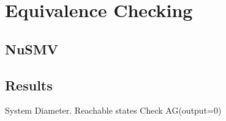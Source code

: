 \documentclass[11pt]{article}
\begin{document}
	

%

\section{Equivalence Checking} 
\subsection{NuSMV}
\subsection{Results}
System Diameter.
Reachable states
Check AG(output=0)

%  
\end{document}
